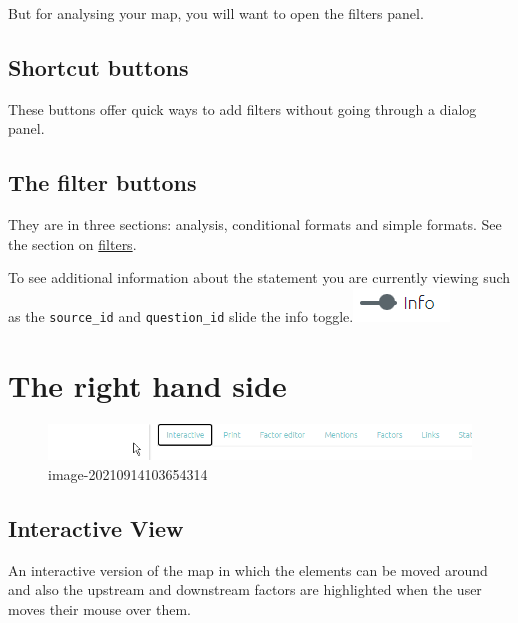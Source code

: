 \documentclass[
]{book}
\begin{document}
But for analysing your map, you will want to open the filters panel.

\hypertarget{shortcut-buttons}{%
\subsection{Shortcut buttons}\label{shortcut-buttons}}

These buttons offer quick ways to add filters without going through a dialog panel.

\hypertarget{the-filter-buttons}{%
\subsection{The filter buttons}\label{the-filter-buttons}}

They are in three sections: analysis, conditional formats and simple formats. See the section on \href{https://guide.causalmap.app/all-the-filters.html}{filters}.

To see additional information about the statement you are currently viewing such as the \texttt{source\_id} and \texttt{question\_id} slide the info toggle.\includegraphics{_assets/image-20211220153438354.png}

\hypertarget{rhs}{%
\section{The right hand side}\label{rhs}}

\begin{figure}
\centering
\includegraphics[width=6.77083in,height=\textheight]{_assets/image-20210914103654314.png}
\caption{image-20210914103654314}
\end{figure}

\hypertarget{not2}{%
\subsection{Interactive View}\label{not2}}

An interactive version of the map in which the elements can be moved around and also the upstream and downstream factors are highlighted when the user moves their mouse over them.
\end{document}
